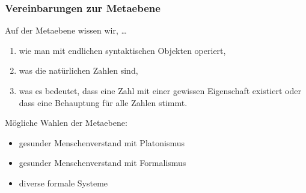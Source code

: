 \documentclass[12pt,compress,ngerman,utf8,t]{beamer}
\renewcommand{\_}{\mathpunct{.}\,}
\begin{document}
\begin{frame}\frametitle{Vereinbarungen zur Metaebene}
  Auf der Metaebene wissen wir, \ldots
  \begin{enumerate}
    \item wie man mit endlichen syntaktischen Objekten operiert,

    \item was die natürlichen Zahlen sind,

    \begin{center}\end{center}

    \item was es bedeutet, dass eine Zahl mit einer gewissen Eigenschaft
    existiert oder dass eine Behauptung für alle Zahlen stimmt.
  \end{enumerate}

  \pause

  Mögliche Wahlen der Metaebene:
  \begin{itemize}
    \item gesunder Menschenverstand mit Platonismus
    \item gesunder Menschenverstand mit Formalismus
    \item diverse formale Systeme
  \end{itemize}
\end{frame}
\end{document}
